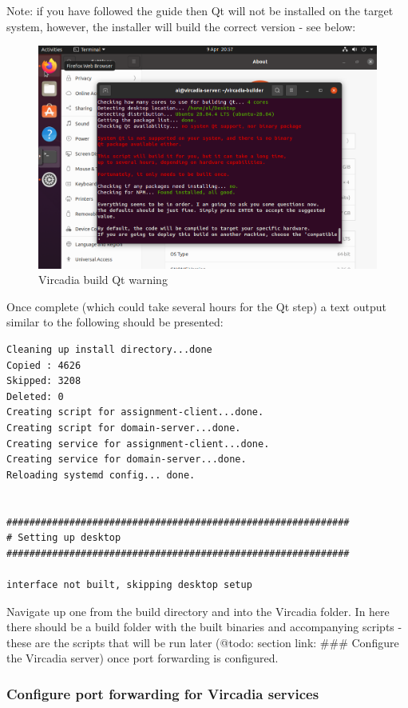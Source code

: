 Note: if you have followed the guide then Qt will not be installed on
the target system, however, the installer will build the correct version
- see below:

\begin{figure}
\centering
\includegraphics{UbuntuDesktop20_04VircadiaQTWarnings.png}
\caption{Vircadia build Qt warning}
\end{figure}

Once complete (which could take several hours for the Qt step) a text
output similar to the following should be presented:

\begin{verbatim}
Cleaning up install directory...done
Copied : 4626
Skipped: 3208
Deleted: 0
Creating script for assignment-client...done.
Creating script for domain-server...done.
Creating service for assignment-client...done.
Creating service for domain-server...done.
Reloading systemd config... done.


############################################################
# Setting up desktop
############################################################

interface not built, skipping desktop setup
\end{verbatim}

Navigate up one from the build directory and into the Vircadia folder.
In here there should be a build folder with the built binaries and
accompanying scripts - these are the scripts that will be run later
(@todo: section link: \#\#\# Configure the Vircadia server) once port
forwarding is configured.

\hypertarget{configure-port-forwarding-for-vircadia-services}{%
\subsubsection{Configure port forwarding for Vircadia
services}\label{configure-port-forwarding-for-vircadia-services}}

